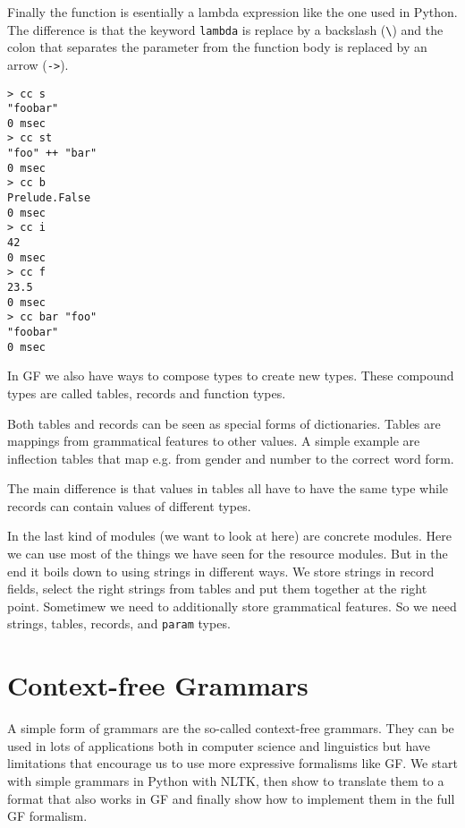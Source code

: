 \documentclass{scrartcl}
\begin{document}
Finally the function is esentially a lambda expression like the one used in Python. The difference is that the keyword \texttt{lambda} is replace by a backslash (\texttt{\textbackslash}) and the colon that separates the parameter from the function body is replaced by an arrow (\texttt{->}).

\begin{verbatim}
> cc s
"foobar"
0 msec
> cc st
"foo" ++ "bar"
0 msec
> cc b
Prelude.False
0 msec
> cc i
42
0 msec
> cc f
23.5
0 msec
> cc bar "foo"
"foobar"
0 msec
\end{verbatim}

In GF we also have ways to compose types to create new types. These compound types are called tables, records and function types.

Both tables and records can be seen as special forms of dictionaries. Tables are mappings from grammatical features to other values. A simple example are inflection tables that map e.g. from gender and number to the correct word form.

The main difference is that values in tables all have to have the same type while records can contain values of different types.

In the last kind of modules (we want to look at here) are concrete modules. Here we can use most of the things we have seen for the resource modules. But in the end it boils down to using strings in different ways. We store strings in record fields, select the right strings from tables and put them together at the right point. Sometimew we need to additionally store grammatical features. So we need strings, tables, records, and \texttt{param} types.

\section{Context-free Grammars}

A simple form of grammars are the so-called context-free grammars. They can be used in lots of applications both in computer science and linguistics but have limitations that encourage us to use more expressive formalisms like GF. We start with simple grammars in Python with NLTK, then show to translate them to a format that also works in GF and finally show how to implement them in the full GF formalism.
\end{document}
